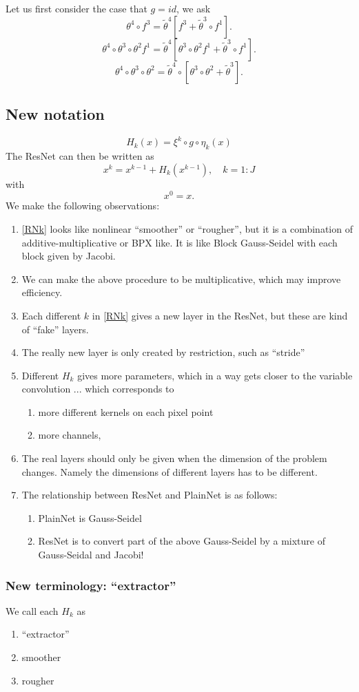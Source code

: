 Let us first consider the case that $g=id$, we ask
$$
\theta^4\circ f^3=\tilde \theta^4[f^3+\tilde \theta^3\circ f^1].    
$$
$$
\theta^4\circ \theta^3\circ \theta^2 f^1=\tilde \theta^4[\theta^3\circ \theta^2 f^1+\tilde \theta^3\circ f^1].    
$$
$$
\theta^4\circ \theta^3\circ \theta^2 =\tilde \theta^4\circ [\theta^3\circ \theta^2 +\tilde \theta^3].    
$$


\newpage
\subsection{New notation}
\begin{equation}
  \label{extractor}
H_k(x)=\xi^k\circ g\circ \eta_k(x)  
\end{equation}
The ResNet can then be written as
\begin{equation}  \label{RNk}
x^k=x^{k-1}+H_k(x^{k-1}), \quad k=1:J  
\end{equation}
with 
$$
x^0=x.
$$
We make the following observations:
\begin{enumerate}
\item \eqref{RNk} looks like nonlinear ``smoother'' or ``rougher'',
  but it is a combination of additive-multiplicative or
  BPX like.  It is like Block Gauss-Seidel with each block given by Jacobi.
\item We can make the above procedure to be multiplicative, which may
  improve efficiency. 
\item Each different $k$ in \eqref{RNk} gives a new layer in the
  ResNet, but these are kind of ``fake'' layers.
\item The really new layer is only created by restriction, such as
  ``stride''
\item Different $H_k$ gives more parameters, which in a way gets
  closer to the variable convolution ... which corresponds to
  \begin{enumerate}
\item more different kernels on each pixel point
\item  more channels, 
\end{enumerate}
\item The real layers should only be given when the dimension of the 
  problem changes.   Namely the dimensions of different layers has to be
  different. 
\item The relationship between ResNet and PlainNet is as follows:
  \begin{enumerate}
  \item PlainNet is Gauss-Seidel
\item ResNet is to convert part of the above Gauss-Seidel by a mixture
  of   Gauss-Seidal and Jacobi!
  \end{enumerate}
\end{enumerate}

\subsubsection{New terminology: ``extractor''}
We call each $H_k$ as 
\begin{enumerate}
\item ``extractor''
\item smoother
\item rougher
\end{enumerate}



